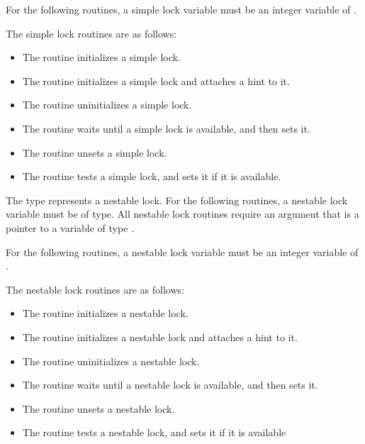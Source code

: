 \begin{fortranspecific}
For the following routines, a simple lock variable must be an integer variable of
.
\end{fortranspecific}

The simple lock routines are as follows:

\begin{itemize}
\item The  routine initializes a simple lock.

\item The  routine initializes a simple lock and attaches a hint to it.

\item The  routine uninitializes a simple lock.

\item The  routine waits until a simple lock is available, and then sets it.

\item The  routine unsets a simple lock.

\item The  routine tests a simple lock, and sets it if it is available.
\end{itemize}

\begin{ccppspecific}
The type  represents a nestable lock.
For the following routines, a nestable lock variable must be of  type.
All nestable lock routines require an argument that is a pointer to a variable of type
.
\end{ccppspecific}

\begin{fortranspecific}
For the following routines, a nestable lock variable must be an integer variable of
.
\end{fortranspecific}

The nestable lock routines are as follows:

\begin{itemize}
\item The  routine initializes a nestable lock.

\item The  routine initializes a nestable lock and attaches a hint to it.

\item The  routine uninitializes a nestable lock.

\item The  routine waits until a nestable lock is available, and then
sets it.

\item The  routine unsets a nestable lock.

\item The  routine tests a nestable lock, and sets it if it is
available
\end{itemize}

